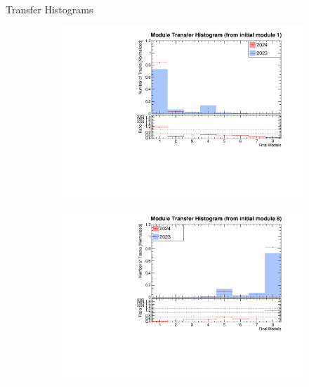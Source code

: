 \begin{frame}{Transfer Histograms}
    \begin{figure}
        \centering
        \begin{subfigure}[t]{0.49\linewidth}
            \includegraphics[width=\linewidth]{./ModuleLevelPlots/final_module_from_st0_module1.pdf}
        \end{subfigure}
        \begin{subfigure}[t]{0.49\linewidth}
            \includegraphics[width=\linewidth]{./ModuleLevelPlots/final_module_from_st0_module8.pdf}
        \end{subfigure}


\end{figure}
\end{frame}
